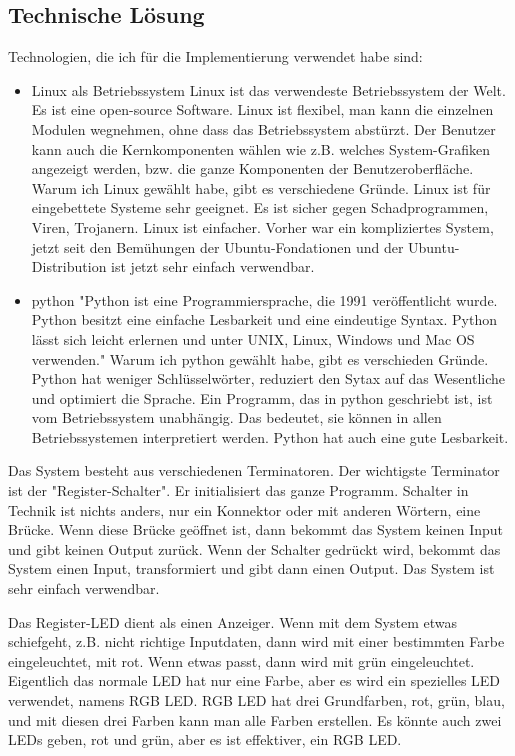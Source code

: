  \subsection{Technische Lösung}
Technologien, die ich für die Implementierung verwendet habe sind: 
\begin{itemize}
	\item Linux als Betriebssystem \cite{Linux_Betriebssystem}
	Linux ist das verwendeste Betriebssystem der Welt. Es ist eine open-source Software. Linux ist flexibel, man kann die einzelnen Modulen wegnehmen, ohne dass das Betriebssystem abstürzt. Der Benutzer kann auch die Kernkomponenten wählen wie z.B. welches System-Grafiken angezeigt werden, bzw. die ganze Komponenten der Benutzeroberfläche. Warum ich Linux gewählt habe, gibt es verschiedene Gründe. Linux ist für eingebettete Systeme sehr geeignet. Es ist sicher gegen Schadprogrammen, Viren, Trojanern. Linux ist einfacher. Vorher war ein kompliziertes System, jetzt seit den Bemühungen der Ubuntu-Fondationen und der Ubuntu-Distribution ist jetzt sehr einfach verwendbar.\\
	\item python
	"Python ist eine Programmiersprache, die 1991 veröffentlicht wurde. Python besitzt eine einfache Lesbarkeit und eine eindeutige Syntax. Python lässt sich leicht erlernen und unter UNIX, Linux, Windows und Mac OS verwenden." \cite{python} Warum ich python gewählt habe, gibt es verschieden Gründe. Python hat weniger Schlüsselwörter, reduziert den Sytax auf das Wesentliche und optimiert die Sprache. Ein Programm, das in python geschriebt ist, ist vom Betriebssystem unabhängig. Das bedeutet, sie können in allen Betriebssystemen interpretiert werden. Python hat auch eine gute Lesbarkeit. \\
	
\end{itemize}
Das System besteht aus verschiedenen Terminatoren. Der wichtigste Terminator ist der "Register-Schalter". Er initialisiert das ganze Programm. Schalter in Technik ist nichts anders, nur ein Konnektor oder mit anderen Wörtern, eine Brücke. Wenn diese Brücke geöffnet ist, dann bekommt das System keinen Input und gibt keinen Output zurück. Wenn der Schalter gedrückt wird, bekommt das System einen Input, transformiert und gibt dann einen Output. Das System ist sehr einfach verwendbar.

Das Register-LED dient als einen Anzeiger. Wenn mit dem System etwas schiefgeht, z.B. nicht richtige Inputdaten, dann wird mit einer bestimmten Farbe eingeleuchtet, mit rot. Wenn etwas passt, dann wird mit grün eingeleuchtet. Eigentlich das normale LED hat nur eine Farbe, aber es wird ein spezielles LED verwendet, namens RGB LED. RGB LED hat drei Grundfarben, rot, grün, blau, und mit diesen drei Farben kann man alle Farben erstellen. Es könnte auch zwei LEDs geben, rot und grün, aber es ist effektiver, ein RGB LED. 

